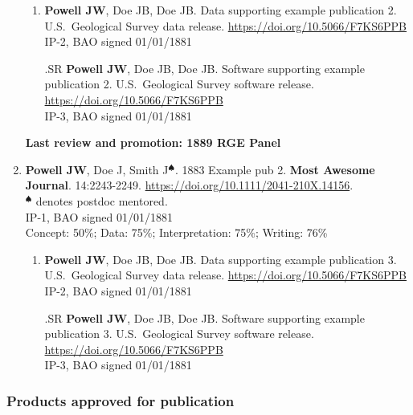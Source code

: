 \begin{enumerate}
  \begin{enumerate}
    \item
    \textbf{Powell JW}, Doe JB, Doe JB.
      Data supporting example publication 2.
      U.S.~Geological Survey data release.
      \url{https://doi.org/10.5066/F7KS6PPB} \\
      IP-2, BAO signed 01/01/1881
    \item[\theenumi.SR]
    \textbf{Powell JW}, Doe JB, Doe JB.
    Software supporting example publication 2.
    U.S.~Geological Survey software release.
    \url{https://doi.org/10.5066/F7KS6PPB} \\
    IP-3, BAO signed 01/01/1881
  \end{enumerate}

  \noindent\makebox[\linewidth]{\rule{\textwidth}{1pt}}

  \textbf{Last review and promotion: 1889 RGE Panel} 
  
  \item 
  \textbf{Powell JW}, Doe J, Smith J\(^\spadesuit\).
  1883
  Example pub 2.
  \textbf{Most Awesome Journal}. 14:2243-2249.
  \url{https://doi.org/10.1111/2041-210X.14156}.\\
  \(^\spadesuit\) denotes postdoc  mentored.\\
  IP-1, BAO signed 01/01/1881  \\
  Concept: 50\%; Data: 75\%; Interpretation: 75\%;
  Writing: 76\% \label{example3}

  \begin{enumerate}
    \item
    \textbf{Powell JW}, Doe JB, Doe JB.
      Data supporting example publication 3.
      U.S.~Geological Survey data release.
      \url{https://doi.org/10.5066/F7KS6PPB} \\
      IP-2, BAO signed 01/01/1881
    \item[\theenumi.SR]
    \textbf{Powell JW}, Doe JB, Doe JB.
    Software supporting example publication 3.
    U.S.~Geological Survey software release.
    \url{https://doi.org/10.5066/F7KS6PPB} \\
    IP-3, BAO signed 01/01/1881 
  \end{enumerate}
  \setcounter{paperCount}{\value{enumi}}
 \end{enumerate}

 \subsubsection*{Products approved for publication}
 
